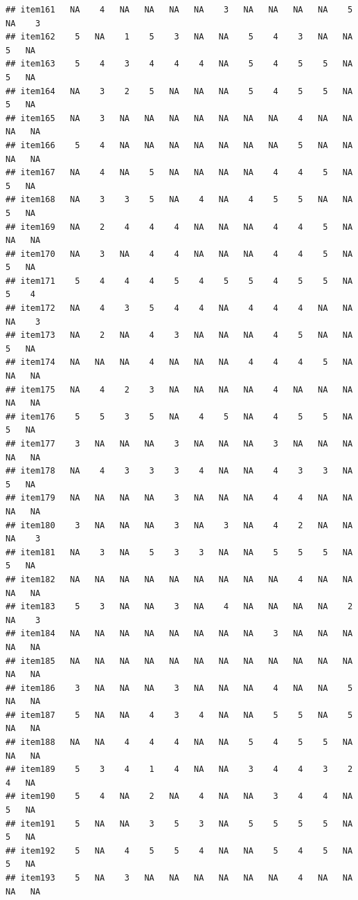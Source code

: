 \documentclass[
  man]{apa6}
\begin{document}
\begin{verbatim}
## item161   NA    4   NA   NA   NA   NA    3   NA   NA   NA   NA    5   NA    3
## item162    5   NA    1    5    3   NA   NA    5    4    3   NA   NA    5   NA
## item163    5    4    3    4    4    4   NA    5    4    5    5   NA    5   NA
## item164   NA    3    2    5   NA   NA   NA    5    4    5    5   NA    5   NA
## item165   NA    3   NA   NA   NA   NA   NA   NA   NA    4   NA   NA   NA   NA
## item166    5    4   NA   NA   NA   NA   NA   NA   NA    5   NA   NA   NA   NA
## item167   NA    4   NA    5   NA   NA   NA   NA    4    4    5   NA    5   NA
## item168   NA    3    3    5   NA    4   NA    4    5    5   NA   NA    5   NA
## item169   NA    2    4    4    4   NA   NA   NA    4    4    5   NA   NA   NA
## item170   NA    3   NA    4    4   NA   NA   NA    4    4    5   NA    5   NA
## item171    5    4    4    4    5    4    5    5    4    5    5   NA    5    4
## item172   NA    4    3    5    4    4   NA    4    4    4   NA   NA   NA    3
## item173   NA    2   NA    4    3   NA   NA   NA    4    5   NA   NA    5   NA
## item174   NA   NA   NA    4   NA   NA   NA    4    4    4    5   NA   NA   NA
## item175   NA    4    2    3   NA   NA   NA   NA    4   NA   NA   NA   NA   NA
## item176    5    5    3    5   NA    4    5   NA    4    5    5   NA    5   NA
## item177    3   NA   NA   NA    3   NA   NA   NA    3   NA   NA   NA   NA   NA
## item178   NA    4    3    3    3    4   NA   NA    4    3    3   NA    5   NA
## item179   NA   NA   NA   NA    3   NA   NA   NA    4    4   NA   NA   NA   NA
## item180    3   NA   NA   NA    3   NA    3   NA    4    2   NA   NA   NA    3
## item181   NA    3   NA    5    3    3   NA   NA    5    5    5   NA    5   NA
## item182   NA   NA   NA   NA   NA   NA   NA   NA   NA    4   NA   NA   NA   NA
## item183    5    3   NA   NA    3   NA    4   NA   NA   NA   NA    2   NA    3
## item184   NA   NA   NA   NA   NA   NA   NA   NA    3   NA   NA   NA   NA   NA
## item185   NA   NA   NA   NA   NA   NA   NA   NA   NA   NA   NA   NA   NA   NA
## item186    3   NA   NA   NA    3   NA   NA   NA    4   NA   NA    5   NA   NA
## item187    5   NA   NA    4    3    4   NA   NA    5    5   NA    5   NA   NA
## item188   NA   NA    4    4    4   NA   NA    5    4    5    5   NA   NA   NA
## item189    5    3    4    1    4   NA   NA    3    4    4    3    2    4   NA
## item190    5    4   NA    2   NA    4   NA   NA    3    4    4   NA    5   NA
## item191    5   NA   NA    3    5    3   NA    5    5    5    5   NA    5   NA
## item192    5   NA    4    5    5    4   NA   NA    5    4    5   NA    5   NA
## item193    5   NA    3   NA   NA   NA   NA   NA   NA    4   NA   NA   NA   NA

\end{verbatim}
\end{document}
